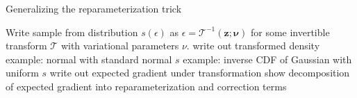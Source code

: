 \documentclass{article}
\begin{document}
\par{Generalizing the reparameterization trick}

Write sample from distribution $s(\epsilon)$ as $\epsilon = \mathcal{T}^{-1}(\mathbf{z}; \mathbf{\nu})$ for some invertible transform $\mathcal{T}$ with variational parameters $\nu$.
write out transformed density
example: normal with standard normal $s$
example: inverse CDF of Gaussian with uniform $s$
write out expected gradient under transformation
show decomposition of expected gradient into reparameterization and correction terms 



\end{document}
